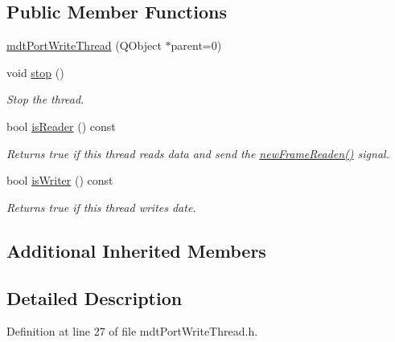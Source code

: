 \subsection*{Public Member Functions}
\begin{DoxyCompactItemize}
\item 
\hyperlink{classmdt_port_write_thread_a994b96eafdd721ccff2f2410a5abd5e3}{mdt\-Port\-Write\-Thread} (Q\-Object $\ast$parent=0)
\item 
void \hyperlink{classmdt_port_write_thread_a69702ab3a95c238fb451f866efc7cb34}{stop} ()
\begin{DoxyCompactList}\small\item\em Stop the thread. \end{DoxyCompactList}\item 
bool \hyperlink{classmdt_port_write_thread_ac37bb988773f624def51e841998a2f1e}{is\-Reader} () const 
\begin{DoxyCompactList}\small\item\em Returns true if this thread reads data and send the \hyperlink{classmdt_port_thread_a7fc2245c753fd65e1beffec211c41461}{new\-Frame\-Readen()} signal. \end{DoxyCompactList}\item 
bool \hyperlink{classmdt_port_write_thread_ad2508c3a2433383e2de705e9f3d2e602}{is\-Writer} () const 
\begin{DoxyCompactList}\small\item\em Returns true if this thread writes date. \end{DoxyCompactList}\end{DoxyCompactItemize}
\subsection*{Additional Inherited Members}


\subsection{Detailed Description}


Definition at line 27 of file mdt\-Port\-Write\-Thread.\-h.



